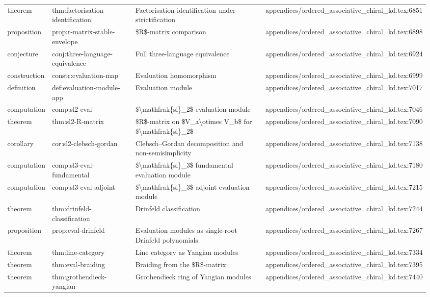 \documentclass[11pt]{article}
\begin{document}
\begin{longtable}{L{0.10\textwidth}L{0.26\textwidth}L{0.42\textwidth}L{0.22\textwidth}}
theorem & thm:factorisation-identification & Factorisation identification under strictification & appendices/ordered\_associative\_chiral\_kd.tex:6851\\
proposition & prop:r-matrix-stable-envelope & \$R\$-matrix comparison & appendices/ordered\_associative\_chiral\_kd.tex:6898\\
conjecture & conj:three-language-equivalence & Full three-language equivalence & appendices/ordered\_associative\_chiral\_kd.tex:6924\\
construction & constr:evaluation-map & Evaluation homomorphism & appendices/ordered\_associative\_chiral\_kd.tex:6999\\
definition & def:evaluation-module-app & Evaluation module & appendices/ordered\_associative\_chiral\_kd.tex:7017\\
computation & comp:sl2-eval & \$\textbackslash{}mathfrak\{sl\}\_2\$ evaluation module & appendices/ordered\_associative\_chiral\_kd.tex:7046\\
theorem & thm:sl2-R-matrix & \$R\$-matrix on \$V\_a\textbackslash{}otimes V\_b\$ for \$\textbackslash{}mathfrak\{sl\}\_2\$ & appendices/ordered\_associative\_chiral\_kd.tex:7090\\
corollary & cor:sl2-clebsch-gordan & Clebsch--Gordan decomposition and non-semisimplicity & appendices/ordered\_associative\_chiral\_kd.tex:7138\\
computation & comp:sl3-eval-fundamental & \$\textbackslash{}mathfrak\{sl\}\_3\$ fundamental evaluation module & appendices/ordered\_associative\_chiral\_kd.tex:7180\\
computation & comp:sl3-eval-adjoint & \$\textbackslash{}mathfrak\{sl\}\_3\$ adjoint evaluation module & appendices/ordered\_associative\_chiral\_kd.tex:7215\\
theorem & thm:drinfeld-classification & Drinfeld classification & appendices/ordered\_associative\_chiral\_kd.tex:7244\\
proposition & prop:eval-drinfeld & Evaluation modules as single-root Drinfeld polynomials & appendices/ordered\_associative\_chiral\_kd.tex:7267\\
theorem & thm:line-category & Line category as Yangian modules & appendices/ordered\_associative\_chiral\_kd.tex:7334\\
theorem & thm:eval-braiding & Braiding from the \$R\$-matrix & appendices/ordered\_associative\_chiral\_kd.tex:7395\\
theorem & thm:grothendieck-yangian & Grothendieck ring of Yangian modules & appendices/ordered\_associative\_chiral\_kd.tex:7440\\

\end{longtable}
\end{document}
